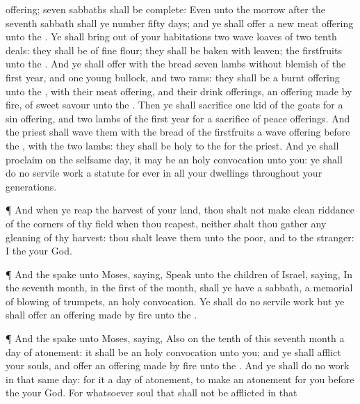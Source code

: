 {offering;
seven
sabbaths shall
be
complete:
Even
unto the
morrow after the
seventh
sabbath shall ye
number
fifty
days; and ye shall
offer a
new meat
offering unto the
{}.
Ye shall bring
out of your
habitations
two
wave
loaves of
two tenth
deals: they shall be of fine
flour; they shall be
baken with
leaven;
{} the
firstfruits unto the
{}.
And ye shall
offer with the
bread
seven
lambs without
blemish of the
first
year, and
one
young
bullock, and
two
rams: they shall be
{} a burnt
offering unto the
{}, with their meat
offering, and their drink
offerings,
{} an offering made by
fire, of
sweet
savour unto the
{}.
Then ye shall
sacrifice
one
kid of the
goats for a sin
offering, and
two
lambs of the
first
year for a
sacrifice of peace
offerings.
And the
priest shall
wave them with the
bread of the
firstfruits
{} a wave
offering
before the
{}, with the
two
lambs: they shall be
holy to the
{} for the
priest.
And ye shall
proclaim on the
selfsame
day,
{} it may be an
holy
convocation unto you: ye shall
do no
servile
work
{} a
statute for
ever in all your
dwellings throughout your
generations.
\par }{\PP {}¶ And when ye
reap the
harvest of your
land, thou shalt not make clean
riddance of the
corners of thy
field when thou
reapest, neither shalt thou
gather any
gleaning of thy
harvest: thou shalt
leave them unto the
poor, and to the
stranger: I
{} the
{} your
God.
\par }{\PP {}¶ And the
{}
spake unto
Moses,
saying,
Speak unto the
children of
Israel,
saying, In the
seventh
month, in the
first
{} of the
month, shall ye have a
sabbath, a
memorial of
blowing of trumpets, an
holy
convocation.
Ye shall
do no
servile
work
{} but ye shall
offer an offering made by
fire unto the
{}.
\par }{\PP {}¶ And the
{}
spake unto
Moses,
saying,
Also on the
tenth
{} of this
seventh
month
{} a
day of
atonement: it shall be an
holy
convocation unto you; and ye shall
afflict your
souls, and
offer an offering made by
fire unto the
{}.
And ye shall
do no
work in that
same
day: for it
{} a
day of
atonement, to make an
atonement for you
before the
{} your
God.
For whatsoever
soul
{} that shall not be
afflicted in that
}
